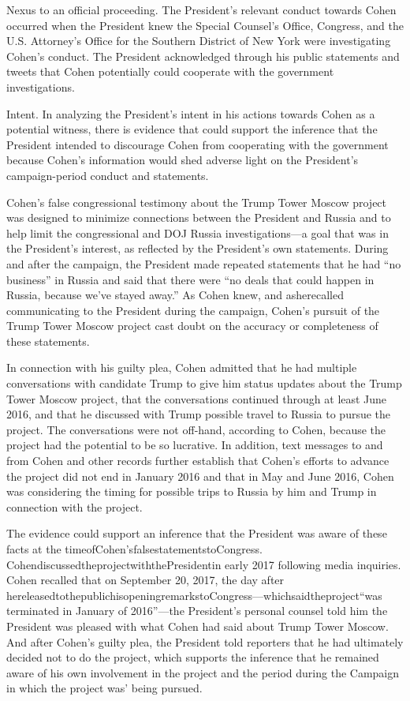 {Nexus to an official proceeding.
The President's relevant conduct towards Cohen occurred when the President knew the Special Counsel's Office, Congress, and the U.S. Attorney's Office for the Southern District of New York were investigating Cohen's conduct.
The President acknowledged through his public statements and tweets that Cohen potentially could cooperate with the government investigations.

Intent.
In analyzing the President's intent in his actions towards Cohen as a potential witness, there is evidence that could support the inference that the President intended to discourage Cohen from cooperating with the government because Cohen's information would shed adverse light on the President's campaign-period conduct and statements.

Cohen's false congressional testimony about the Trump Tower Moscow project was designed to minimize connections between the President and Russia and to help limit the congressional and DOJ Russia investigations—a goal that was in the President's interest, as reflected by the President's own statements.
During and after the campaign, the President made repeated statements that he had “no business” in Russia and said that there were “no deals that could happen in Russia, because we've stayed away.”
As Cohen knew, and asherecalled communicating to the President during the campaign, Cohen's pursuit of the Trump Tower Moscow project cast doubt on the accuracy or completeness of these statements.

In connection with his guilty plea, Cohen admitted that he had multiple conversations with candidate Trump to give him status updates about the Trump Tower Moscow project, that the conversations continued through at least June 2016, and that he discussed with Trump possible travel to Russia to pursue the project.
The conversations were not off-hand, according to Cohen, because the project had the potential to be so lucrative.
In addition, text messages to and from Cohen and other records further establish that Cohen's efforts to advance the project did not end in January 2016 and that in May and June 2016, Cohen was considering the timing for possible trips to Russia by him and Trump in connection with the project.

The evidence could support an inference that the President was aware of these facts at the timeofCohen'sfalsestatementstoCongress.
CohendiscussedtheprojectwiththePresidentin early 2017 following media inquiries.
Cohen recalled that on September 20, 2017, the day after hereleasedtothepublichisopeningremarkstoCongress—whichsaidtheproject“was terminated in January of 2016”—the President's personal counsel told him the President was pleased with what Cohen had said about Trump Tower Moscow.
And after Cohen's guilty plea, the President told reporters that he had ultimately decided not to do the project, which supports the inference that he remained aware of his own involvement in the project and the period during the Campaign in which the project was' being pursued.

}
